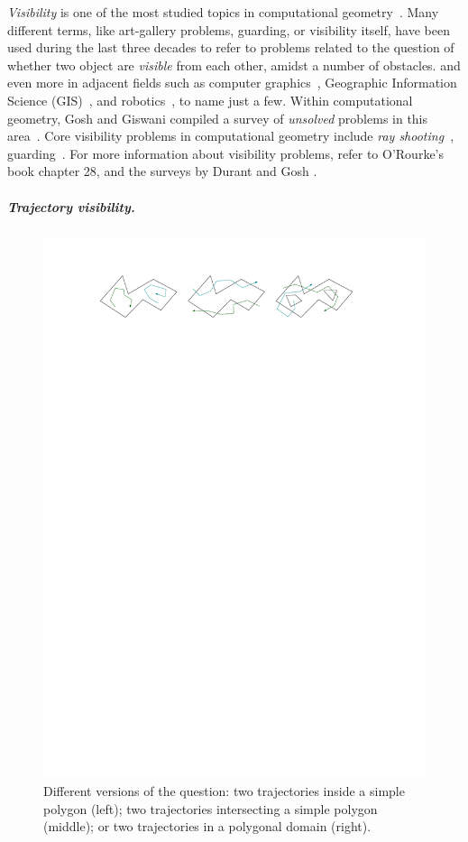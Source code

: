 \documentclass[a4paper, UKenglish]{lipics-v2018}
\begin{document}
\emph{Visibility} is one of the most studied topics in computational geometry~\cite {moet,welzl1985constructing,POCCHIOLA1996279}.
Many different terms, like art-gallery problems, guarding, or visibility itself, have been used during the last three decades to refer to problems related to the question of whether two object are \emph{visible} from each other, amidst a number of obstacles.
and even more in adjacent fields such as computer graphics~\cite {Durand00amultidisciplinary}, Geographic Information Science (GIS)~\cite{FM03}, and robotics~\cite {moet}, to name just a few.
Within computational geometry, Gosh and Giswani compiled a survey of {\em unsolved} problems in this area~\cite {Ghosh:2013:UPV:2543581.2543589}.
Core visibility problems in computational geometry include {\em ray shooting}~\cite{10,13,17,20}, guarding~\cite {Chvatal75,Fisk78,survey}.
For more information about visibility problems, refer to O'Rourke's book \cite{ORourke87} chapter 28, and the surveys by Durant \cite{durand2000multidisciplinary} and Gosh  \cite{Ghosh:2013:UPV:2543581.2543589}. 

\subparagraph {Trajectory visibility.}


\begin{figure} [tb]
	\centering \includegraphics {variants.pdf} 
	\caption
	{
	  Different versions of the question:
	  two trajectories inside a simple polygon (left);
	  two trajectories intersecting a simple polygon (middle);
	  or two trajectories in a polygonal domain (right).
	}  
	\label{fig:variants}
\end{figure}
\end{document}
